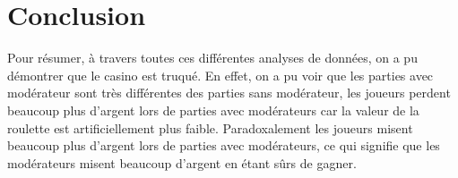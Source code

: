 \documentclass[a4paper, 12pt]{article}
\theoremstyle{exo}
\begin{document}
\newpage

\section{Conclusion}

Pour résumer, à travers toutes ces différentes analyses de données, on a pu démontrer que le casino est truqué. En effet, on a pu voir que les parties avec modérateur sont très différentes des parties sans modérateur, les joueurs perdent beaucoup plus d'argent lors de parties avec modérateurs car la valeur de la roulette est artificiellement plus faible. Paradoxalement les joueurs misent beaucoup plus d'argent lors de parties avec modérateurs, ce qui signifie que les modérateurs misent beaucoup d'argent en étant sûrs de gagner.  
\end{document}
